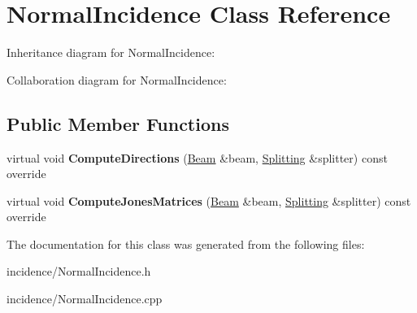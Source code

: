 \hypertarget{class_normal_incidence}{}\section{Normal\+Incidence Class Reference}
\label{class_normal_incidence}


Inheritance diagram for Normal\+Incidence\+:


Collaboration diagram for Normal\+Incidence\+:
\subsection*{Public Member Functions}
\begin{DoxyCompactItemize}
\item 
\mbox{\label{class_normal_incidence_ae8d04d8412f9999bc3fc444256218fb0}} 
virtual void {\bfseries Compute\+Directions} (\mbox{\hyperlink{class_beam}{Beam}} \&beam, \mbox{\hyperlink{class_splitting}{Splitting}} \&splitter) const override
\item 
\mbox{\label{class_normal_incidence_aa6b4bb61cafbda475931501aa1ebcba3}} 
virtual void {\bfseries Compute\+Jones\+Matrices} (\mbox{\hyperlink{class_beam}{Beam}} \&beam, \mbox{\hyperlink{class_splitting}{Splitting}} \&splitter) const override
\end{DoxyCompactItemize}


The documentation for this class was generated from the following files\+:\begin{DoxyCompactItemize}
\item 
incidence/Normal\+Incidence.\+h\item 
incidence/Normal\+Incidence.\+cpp\end{DoxyCompactItemize}
